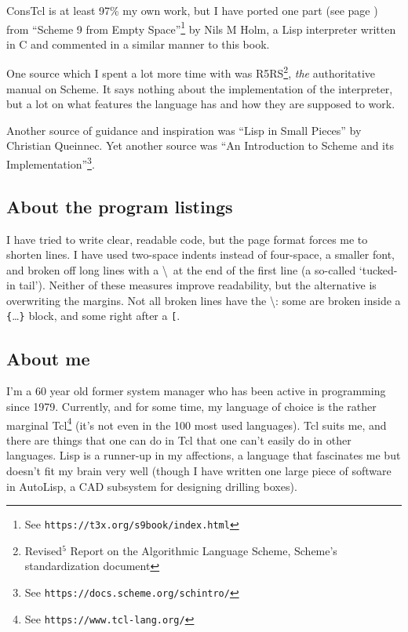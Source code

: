 \documentclass[a5paper,draft]{memoir}
\begin{document}
ConsTcl is at least 97\% my own work, but I have ported one part (see page
\pageref{resolving-local-defines}) from ``Scheme 9 from Empty
Space''\footnote{See \texttt{https://t3x.org/s9book/index.html}} by Nils M Holm, a Lisp
interpreter written in C and commented in a similar manner to this book.

One source which I spent a lot more time with was R5RS\footnote{Revised${}^{5}$
Report on the Algorithmic Language Scheme, Scheme's standardization document},
\emph{the} authoritative manual on Scheme. It says nothing about the
implementation of the interpreter, but a lot on what features the language has
and how they are supposed to work.

Another source of guidance and inspiration was ``Lisp in Small Pieces'' by
Christian Queinnec. Yet another source was ``An Introduction to Scheme and its
Implementation''\footnote{See \texttt{https://docs.scheme.org/schintro/}}.

\subsection{About the program listings}
\label{about-the-program-listings}

I have tried to write clear, readable code, but the page format forces me to
shorten lines. I have used two-space indents instead of four-space, a smaller
font, and broken off long lines with a \textbackslash\  at the end of the first
line (a so-called `tucked-in tail'). Neither of these measures improve
readability, but the alternative is overwriting the margins. Not all broken
lines have the \textbackslash: some are broken inside a
\texttt{\{}\ldots\texttt{\}} block, and some right after a \texttt{^^5b}.

\subsection{About me}
\label{about-me}

I'm a 60 year old former system manager who has been active in programming
since 1979. Currently, and for some time, my language of choice is the
rather marginal Tcl\footnote{See \texttt{https://www.tcl-lang.org/}} (it's not
even in the 100 most used languages). Tcl suits me, and there are things that
one can do in Tcl that one can't easily do in other languages. Lisp is a
runner-up in my affections, a language that fascinates me but doesn't fit my
brain very well (though I have written one large piece of software in AutoLisp,
a CAD subsystem for designing drilling boxes).
\end{document}
